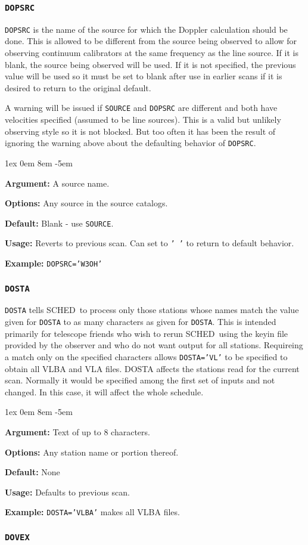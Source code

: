 \documentclass{report}
\newcommand{\schedb}{{\sc SCHED~}}
\newcommand{\rcwbox}[5]{
  \begin{list}{}{\parsep 1ex  \itemsep 0em
                 \leftmargin 8em  \itemindent -5em }
    \item {\bf Argument:} #1
    \item {\bf Options:}  #2
    \item {\bf Default:}  #3
    \item {\bf Usage:}    #4
    \item {\bf Example:}  #5
  \end{list}
}
\begin{document}
\subsubsection{\label{MP:DOPSRC}{\tt DOPSRC}}

{\tt DOPSRC} is the name of the source for which the Doppler
calculation should be done. This is allowed to be different from the
source being observed to allow for observing continuum calibrators at
the same frequency as the line source. If it is blank, the source
being observed will be used. If it is not specified, the previous
value will be used so it must be set to blank after use in earlier
scans if it is desired to return to the original default.

A warning will be issued if {\tt SOURCE} and {\tt DOPSRC} are
different and both have velocities specified (assumed to be line
sources).   This is a valid but unlikely observing style so it
is not blocked.  But too often it has been the result of ignoring
the warning above about the defaulting behavior of {\tt DOPSRC}.

\rcwbox
{A source name.}
{Any source in the source catalogs.}
{Blank - use {\tt SOURCE}.}
{Reverts to previous scan. Can set to {\tt ' '} to return to default
behavior.}
{{\tt DOPSRC='W3OH'}}

\subsubsection{\label{MP:DOSTA}{\tt DOSTA}}

{\tt DOSTA} tells \schedb to process only those stations whose
names match the value given for {\tt DOSTA} to as many characters as
given for {\tt DOSTA}. This is intended primarily for telescope
friends who wish to rerun \schedb using the keyin file provided by
the observer and who do not want output for all stations. Requireing a
match only on the specified characters allows {\tt DOSTA='VL'} to be
specified to obtain all VLBA and VLA files.  DOSTA affects the
stations read for the current scan.  Normally it would be specified
among the first set of inputs and not changed.  In this case, it will
affect the whole schedule.

\rcwbox
{Text of up to 8 characters.}
{Any station name or portion thereof.}
{None}
{Defaults to previous scan.}
{{\tt DOSTA='VLBA'} makes all VLBA files.}

\subsubsection{\label{MP:DOVEX}{\tt DOVEX}}
\end{document}
